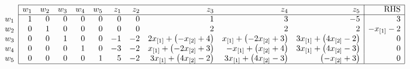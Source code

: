 \documentclass[11pt]{article}
\begin{document}
 

\renewcommand{\arraystretch}{1.5}
$\begin{array}{c|rrrrrrrrrr|r|}
\cline{2-12}
 & w_1 & w_2 & w_3 & w_4 & w_5 & z_1 & z_2 & z_3 & z_4 & z_5 & \text{RHS}\\
\cline{2-12}
w_1 & 1&0&0&0&0&0&0&1&3&-5&3\\
w_2 & 0&1&0&0&0&0&0&2&2&2&-x_{[1]}
 - 2\\
w_3 & 0&0&1&0&0&-1&-2&2\*x_{[1]}
 + \left(-x_{[2]}
 + 4\right) &x_{[1]}
 + \left(-2\*x_{[2]}
 + 3\right) &3\*x_{[1]}
 + \left(4\*x_{[2]}
 - 2\right) &0\\
w_4 & 0&0&0&1&0&-3&-2&x_{[1]}
 + \left(-2\*x_{[2]}
 + 3\right) &-x_{[1]}
 + \left(x_{[2]}
 + 4\right) &3\*x_{[1]}
 + \left(4\*x_{[2]}
 - 3\right) &0\\
w_5 & 0&0&0&0&1&5&-2&3\*x_{[1]}
 + \left(4\*x_{[2]}
 - 2\right) &3\*x_{[1]}
 + \left(4\*x_{[2]}
 - 3\right) & \left(-x_{[2]}
 + 3\right) &0\\
\cline{2-12}
\end{array}$~\\~\\
\end{document}
